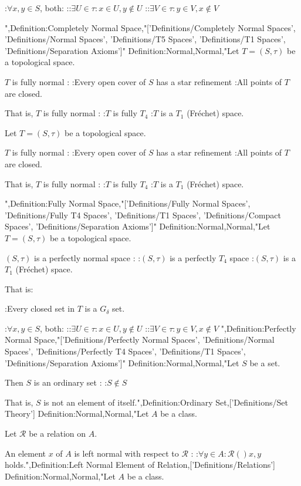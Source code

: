 :$\forall x, y \in S$, both:
::$\exists U \in \tau: x \in U, y \notin U$
::$\exists V \in \tau: y \in V, x \notin V$


",Definition:Completely Normal Space,"['Definitions/Completely Normal Spaces', 'Definitions/Normal Spaces', 'Definitions/T5 Spaces', 'Definitions/T1 Spaces', 'Definitions/Separation Axioms']"
Definition:Normal,Normal,"Let $T = \left( S, \tau \right)$ be a topological space.


$T$ is fully normal :
:Every open cover of $S$ has a star refinement
:All points of $T$ are closed.


That is, $T$ is fully normal :
:$T$ is fully $T_4$
:$T$ is a $T_1$ (Fréchet) space.


Let $T = \left( S, \tau \right)$ be a topological space.


$T$ is fully normal :
:Every open cover of $S$ has a star refinement
:All points of $T$ are closed.


That is, $T$ is fully normal :
:$T$ is fully $T_4$
:$T$ is a $T_1$ (Fréchet) space.


",Definition:Fully Normal Space,"['Definitions/Fully Normal Spaces', 'Definitions/Fully T4 Spaces', 'Definitions/T1 Spaces', 'Definitions/Compact Spaces', 'Definitions/Separation Axioms']"
Definition:Normal,Normal,"Let $T = \left( S, \tau \right)$ be a topological space.


$\left( S, \tau \right)$ is a perfectly normal space :
:$\left( S, \tau \right)$ is a perfectly $T_4$ space
:$\left( S, \tau \right)$ is a $T_1$ (Fréchet) space.


That is:

:Every closed set in $T$ is a $G_\delta$ set.

:$\forall x, y \in S$, both:
::$\exists U \in \tau: x \in U, y \notin U$
::$\exists V \in \tau: y \in V, x \notin V$
",Definition:Perfectly Normal Space,"['Definitions/Perfectly Normal Spaces', 'Definitions/Normal Spaces', 'Definitions/Perfectly T4 Spaces', 'Definitions/T1 Spaces', 'Definitions/Separation Axioms']"
Definition:Normal,Normal,"Let $S$ be a set.

Then $S$ is an ordinary set :
:$S \notin S$

That is,  $S$ is not an element of itself.",Definition:Ordinary Set,['Definitions/Set Theory']
Definition:Normal,Normal,"Let $A$ be a class.

Let $\mathcal R$ be a relation on $A$.


An element $x$ of $A$ is left normal with respect to $\mathcal R$ :
:$\forall y \in A: \mathcal R \left(   \right){x, y}$ holds.",Definition:Left Normal Element of Relation,['Definitions/Relations']
Definition:Normal,Normal,"Let $A$ be a class.

